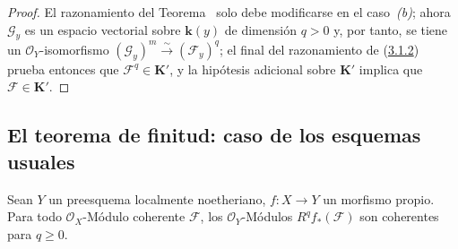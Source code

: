 \begin{proof}
El razonamiento del Teorema~ solo debe modificarse en el caso~\textit{(b)}; ahora $\mathcal G_y$ es un espacio vectorial sobre $\boldsymbol{k}(y)$ de dimensión $q>0$ y, por tanto, se tiene un $\mathcal O_Y$-isomorfismo $(\mathcal G_y)^m\xrightarrow{\sim}(\mathcal F_y)^q$; el final
del razonamiento de (\hyperref[III.3.1.2-fr]{3.1.2}) prueba entonces que
$\mathcal F^q\in\boldsymbol{K}'$, y la hipótesis adicional sobre $\boldsymbol{K}'$ implica que
$\mathcal F\in\boldsymbol{K}'$.
\end{proof}

\subsection{El teorema de finitud: caso de los esquemas usuales}
\label{subsection:III.3.2-fr}

\begin{theorem}[3.2.1]
\label{III.3.2.1-fr}
Sean $Y$ un preesquema localmente noetheriano, $f:X\to Y$ un morfismo
propio. Para todo $\mathcal O_X$-Módulo coherente $\mathcal F$, los
$\mathcal O_Y$-Módulos $R^qf_*(\mathcal F)$ son coherentes para $q\geq0$.
\end{theorem}

